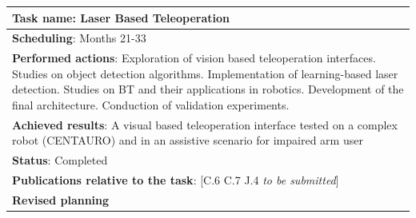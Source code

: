 \begin{table}[H]
	\begin{center}
		\renewcommand{\arraystretch}{1.3} %
		\setlength{\tabcolsep}{8pt} %
		\begin{tabular}{|P{15cm}|}
			\hline
			\textbf{Task name}: Laser Based Teleoperation \\ \hline
			\textbf{Scheduling}: Months 21-33 \\ \hline
			\textbf{Performed actions}: Exploration of vision based teleoperation interfaces. Studies on object detection algorithms. Implementation of learning-based laser detection. Studies on BT and their applications in robotics. Development of the final architecture. Conduction of validation experiments.\\
			\hline
			\textbf{Achieved results}: A visual based teleoperation interface tested on a complex robot (CENTAURO) and in an assistive scenario for impaired arm user\\
			\hline
			\textbf{Status}: Completed\\
			\hline
			\textbf{Publications relative to the task}: [C.6 C.7 J.4 \textit{to be submitted}]\\
			\hline
			\textbf{Revised planning}\\
			\hline
		\end{tabular}
	\end{center}
\end{table}
